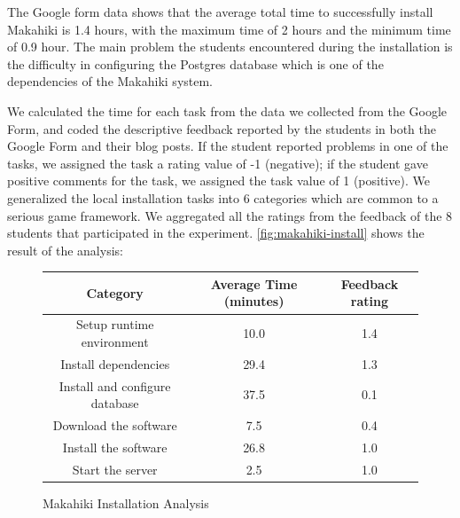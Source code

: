 \documentclass{sigchi}
\newcommand\tabhead[1]{\small\textbf{#1}}
\begin{document}
The Google form data shows that the average total time to successfully install Makahiki
is 1.4 hours, with the maximum time of 2 hours and the minimum time of 0.9 hour. The main
problem the students encountered during the installation is the difficulty in
configuring the Postgres database which is one of the dependencies of
the Makahiki system.

We calculated the time for each task from the data we collected from the Google
Form, and coded the descriptive feedback reported by the students in both the Google Form and
 their blog posts. If the student reported problems in one of the tasks, we assigned the task
  a rating value of -1 (negative); if the student gave positive comments for the task, we
  assigned the task value of 1 (positive). We generalized the local installation tasks into 6
  categories which are common to a serious game framework. We aggregated all the ratings from
  the feedback of the 8 students that participated in the experiment.
  \autoref{fig:makahiki-install} shows the result of the analysis:

\begin{figure}[ht!]
  \centering
  \begin{tabular}{|c|c|c|}
    \hline
    \multicolumn{1}{|p{0.5\columnwidth}|}{\centering\tabhead{Category}} &
    \multicolumn{1}{|p{0.2\columnwidth}|}{\centering\tabhead{Average Time (minutes)}} &
    \multicolumn{1}{|p{0.2\columnwidth}|}{\centering\tabhead{Feedback rating}} \\
    \hline
    \multicolumn{1}{|p{0.5\columnwidth}|}{Setup runtime environment} &
    \multicolumn{1}{|p{0.2\columnwidth}|}{10.0} &
    \multicolumn{1}{|p{0.2\columnwidth}|}{1.4} \\
    \hline
    \multicolumn{1}{|p{0.5\columnwidth}|}{Install dependencies} &
    \multicolumn{1}{|p{0.2\columnwidth}|}{29.4} &
    \multicolumn{1}{|p{0.2\columnwidth}|}{1.3} \\
    \hline
    \multicolumn{1}{|p{0.5\columnwidth}|}{Install and configure database} &
    \multicolumn{1}{|p{0.2\columnwidth}|}{37.5} &
    \multicolumn{1}{|p{0.2\columnwidth}|}{0.1} \\
    \hline
    \multicolumn{1}{|p{0.5\columnwidth}|}{Download the software} &
    \multicolumn{1}{|p{0.2\columnwidth}|}{7.5} &
    \multicolumn{1}{|p{0.2\columnwidth}|}{0.4} \\
    \hline
    \multicolumn{1}{|p{0.5\columnwidth}|}{Install the software} &
    \multicolumn{1}{|p{0.2\columnwidth}|}{26.8} &
    \multicolumn{1}{|p{0.2\columnwidth}|}{1.0} \\
    \hline
    \multicolumn{1}{|p{0.5\columnwidth}|}{Start the server} &
    \multicolumn{1}{|p{0.2\columnwidth}|}{2.5} &
    \multicolumn{1}{|p{0.2\columnwidth}|}{1.0} \\
    \hline
  \end{tabular}
  \caption{Makahiki Installation Analysis}
  \label{fig:makahiki-install}
\end{figure}
\end{document}
